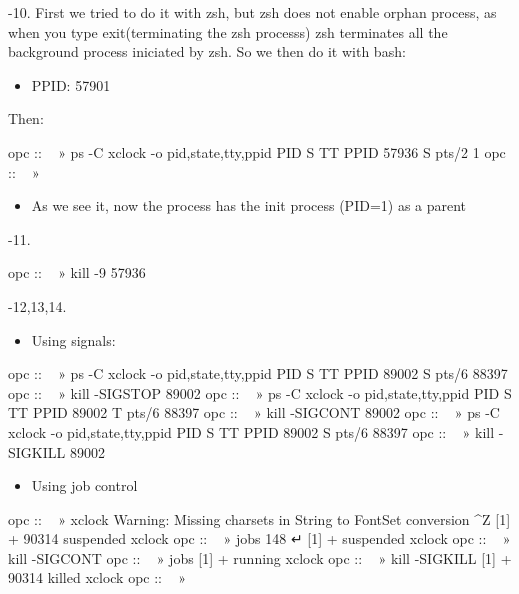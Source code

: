 \documentclass[a4paper]{article}
\begin{document}
{-\allowbreak}10.  First we tried to do it with zsh, but zsh does not enable orphan process, as when you type exit{\allowbreak}(terminating the zsh processs) zsh terminates all the background process iniciated by zsh. So we then do it with bash:

\begin{itemize}
\item 
PPID: 57901
\end{itemize}

Then:

\begin{plain}
opc :: ~ » ps -C xclock -o pid,state,tty,ppid
    PID S TT          PPID
  57936 S pts/2          1
opc :: ~ » 
\end{plain}

\begin{itemize}
\item 
As we see it, now the process has the init process (PID=1) as a parent
\end{itemize}

{-\allowbreak}11.

\begin{plain}
opc :: ~ » kill -9 57936
\end{plain}

{-\allowbreak}12,13,14.

\begin{itemize}
\item 
Using signals:
\end{itemize}

\begin{plain}
opc :: ~ » ps -C xclock -o pid,state,tty,ppid
    PID S TT          PPID
  89002 S pts/6      88397
opc :: ~ » kill -SIGSTOP 89002               
opc :: ~ » ps -C xclock -o pid,state,tty,ppid
    PID S TT          PPID
  89002 T pts/6      88397
opc :: ~ » kill -SIGCONT 89002
opc :: ~ » ps -C xclock -o pid,state,tty,ppid
    PID S TT          PPID
  89002 S pts/6      88397
opc :: ~ » kill -SIGKILL 89002 
\end{plain}

\begin{itemize}
\item 
Using job control 
\end{itemize}

\begin{plain}
opc :: ~ » xclock 
Warning: Missing charsets in String to FontSet conversion
^Z
[1]  + 90314 suspended  xclock
opc :: ~ » jobs                                                                                                       148 ↵
[1]  + suspended  xclock
opc :: ~ » kill -SIGCONT %
opc :: ~ » jobs
[1]  + running    xclock
opc :: ~ » kill -SIGKILL %
[1]  + 90314 killed     xclock                                                                                              
opc :: ~ » 
\end{plain}
\end{document}

